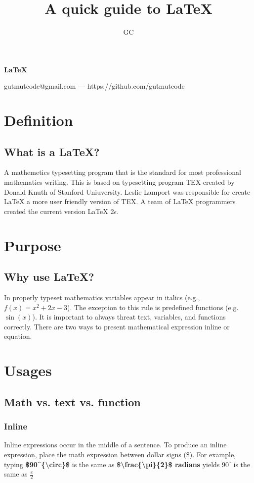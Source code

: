 \documentclass{article}
\makeatletter
\renewcommand{\maketitle}{
 \begin{center}
  {\Huge\bfseries \LaTeX}
  \vspace{1em}

  {\large\bfseries\theauthor}
  \vspace{1em}

  gutmutcode@gmail.com --- https://github.com/gutmutcode

 \end{center}
}
\makeatother
\begin{document}
\title{A quick guide to {\LaTeX}}
\author{GC}

\maketitle
\tableofcontents

\section{Definition}

\subsection{What is a {\LaTeX}?}

A mathemetics typesetting program that is the standard for most professional mathematics writing. This is based on typesetting program TEX created by Donald Knuth of Stanford Uniuversity. Leslie Lamport was responsible for create {\LaTeX} a more user friendly version of TEX. A team of {\LaTeX} programmers created the current version {\LaTeX} 2$\epsilon$.

\section{Purpose}

\subsection{Why use {\LaTeX}?}

In properly typeset mathematics variables appear in italics (e.g., $f(x) = x^2 + 2x - 3$). The exception to this rule is predefined functions (e.g.$\sin(x)$). It is important to always threat text, variables, and functions correctly. There are two ways to present mathematical expression inline or equation.

\section{Usages}

\subsection{Math vs. text vs. function}

\subsubsection{Inline}
Inline expressions occur in the middle of a sentence. To produce an inline expression, place the math expression between dollar signs (\$). For example, typing \textbf{\$90\textasciicircum\{\textbackslash circ\}\$} is the same as \textbf{\$\textbackslash frac\{\textbackslash pi\}\{2\}\$ radians} yields $90^{\circ}$ is the same as $\frac{\pi}{2}$
\end{document}
